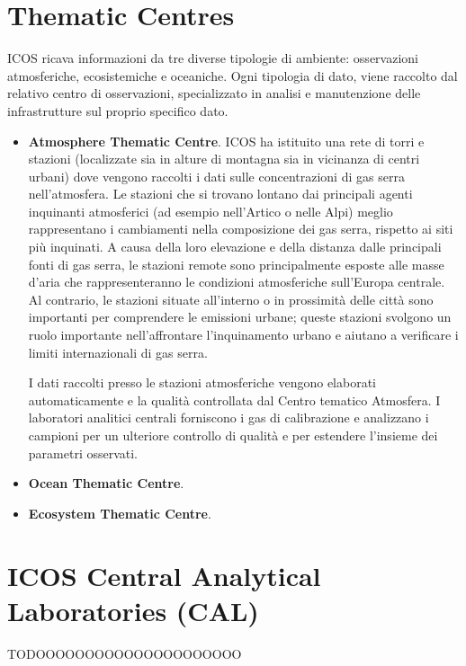 \section{Thematic Centres}
\label{section:thematic}
ICOS ricava informazioni da tre diverse tipologie di ambiente:
osservazioni atmosferiche, ecosistemiche e oceaniche. Ogni
tipologia di dato, viene raccolto dal relativo centro di osservazioni,
specializzato in analisi e manutenzione delle infrastrutture sul proprio
specifico dato.

\begin{itemize}
    \item \textbf{Atmosphere Thematic Centre}.
    ICOS ha istituito una rete di torri e stazioni
    (localizzate sia in alture di montagna sia in vicinanza di centri urbani)
    dove vengono raccolti i dati sulle concentrazioni di gas serra 
    nell'atmosfera. Le stazioni che si trovano lontano dai
    principali agenti inquinanti atmosferici
    (ad esempio nell'Artico o nelle Alpi) meglio
    rappresentano i cambiamenti nella composizione
    dei gas serra, rispetto ai siti più inquinati.
    A causa della loro elevazione e della distanza dalle
    principali fonti di gas serra,
    le stazioni remote sono principalmente esposte
    alle masse d'aria che rappresenteranno le
    condizioni atmosferiche sull'Europa centrale.
    Al contrario, le stazioni situate all'interno o
    in prossimità delle città sono importanti per
    comprendere le emissioni urbane; queste stazioni
    svolgono un ruolo importante nell'affrontare
    l'inquinamento urbano e aiutano a verificare
    i limiti internazionali di gas serra.

I dati raccolti presso le stazioni atmosferiche vengono elaborati automaticamente e la qualità controllata dal Centro tematico Atmosfera. I laboratori analitici centrali forniscono i gas di calibrazione e analizzano i campioni per un ulteriore controllo di qualità e per estendere l'insieme dei parametri osservati.
    \item \textbf{Ocean Thematic Centre}.
    \item \textbf{Ecosystem Thematic Centre}.
\end{itemize}

\section{ICOS Central Analytical Laboratories (CAL)}
\label{section:CAL}
TODOOOOOOOOOOOOOOOOOOOOO